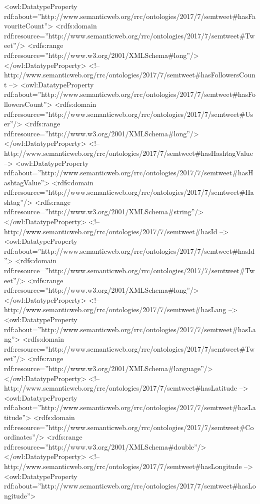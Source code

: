 \begin{listing}[
  language = XML,
  numbers=left,
  numberstyle=\tiny,
  stepnumber=5,
  numbersep=5pt,
  frame=single,
  caption  = {Ontología de tweets: Ontotwitter},
  label    = code:ontotwitter]
    <owl:DatatypeProperty
    rdf:about=''http://www.semanticweb.org/rrc/ontologies/2017/7/semtweet#hasFavouriteCount''>
        <rdfs:domain
        rdf:resource=''http://www.semanticweb.org/rrc/ontologies/2017/7/semtweet#Tweet''/>
        <rdfs:range rdf:resource=''http://www.w3.org/2001/XMLSchema#long''/>
    </owl:DatatypeProperty>
    <!--
    http://www.semanticweb.org/rrc/ontologies/2017/7/semtweet#hasFollowersCount
    -->
    <owl:DatatypeProperty
    rdf:about=''http://www.semanticweb.org/rrc/ontologies/2017/7/semtweet#hasFollowersCount''>
        <rdfs:domain
        rdf:resource=''http://www.semanticweb.org/rrc/ontologies/2017/7/semtweet#User''/>
        <rdfs:range rdf:resource=''http://www.w3.org/2001/XMLSchema#long''/>
    </owl:DatatypeProperty>
    <!--
    http://www.semanticweb.org/rrc/ontologies/2017/7/semtweet#hasHashtagValue
    -->
    <owl:DatatypeProperty
    rdf:about=''http://www.semanticweb.org/rrc/ontologies/2017/7/semtweet#hasHashtagValue''>
        <rdfs:domain
        rdf:resource=''http://www.semanticweb.org/rrc/ontologies/2017/7/semtweet#Hashtag''/>
        <rdfs:range rdf:resource=''http://www.w3.org/2001/XMLSchema#string''/>
    </owl:DatatypeProperty>
    <!-- http://www.semanticweb.org/rrc/ontologies/2017/7/semtweet#hasId -->
    <owl:DatatypeProperty
    rdf:about=''http://www.semanticweb.org/rrc/ontologies/2017/7/semtweet#hasId''>
        <rdfs:domain
        rdf:resource=''http://www.semanticweb.org/rrc/ontologies/2017/7/semtweet#Tweet''/>
        <rdfs:range rdf:resource=''http://www.w3.org/2001/XMLSchema#long''/>
    </owl:DatatypeProperty>
    <!-- http://www.semanticweb.org/rrc/ontologies/2017/7/semtweet#hasLang -->
    <owl:DatatypeProperty
    rdf:about=''http://www.semanticweb.org/rrc/ontologies/2017/7/semtweet#hasLang''>
        <rdfs:domain
        rdf:resource=''http://www.semanticweb.org/rrc/ontologies/2017/7/semtweet#Tweet''/>
        <rdfs:range rdf:resource=''http://www.w3.org/2001/XMLSchema#language''/>
    </owl:DatatypeProperty>
    <!-- http://www.semanticweb.org/rrc/ontologies/2017/7/semtweet#hasLatitude
    -->
    <owl:DatatypeProperty
    rdf:about=''http://www.semanticweb.org/rrc/ontologies/2017/7/semtweet#hasLatitude''>
        <rdfs:domain
        rdf:resource=''http://www.semanticweb.org/rrc/ontologies/2017/7/semtweet#Coordinates''/>
        <rdfs:range rdf:resource=''http://www.w3.org/2001/XMLSchema#double''/>
    </owl:DatatypeProperty>
    <!-- http://www.semanticweb.org/rrc/ontologies/2017/7/semtweet#hasLongitude
    -->
    <owl:DatatypeProperty
    rdf:about=''http://www.semanticweb.org/rrc/ontologies/2017/7/semtweet#hasLongitude''>

\end{listing}
